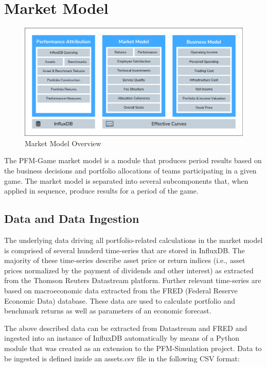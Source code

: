 \section{Market Model}

\begin{figure}[h!]
  \includegraphics[width=\textwidth]{img/market_model.png}
  \caption{Market Model Overview}
  \centering
  \label{fig:market_model_overview}
\end{figure}

The PFM-Game market model is a module that produces period results based on the business decisions and portfolio allocations of teams participating in a given game. The market model is separated into several subcomponents that, when applied in sequence, produce results for a period of the game.

\subsection{Data and Data Ingestion}
The underlying data driving all portfolio-related calculations in the market model is comprised of several hunderd time-series that are stored in InfluxDB. The majority of these time-series describe asset price or return indices (i.e., asset prices normalized by the payment of dividends and other interest) as extracted from the Thomson Reuters Datastream platform. Further relevant time-series are based on macroeconomic data extracted from the FRED (Federal Reserve Economic Data) database. These data are used to calculate portfolio and benchmark returns as well as parameters of an economic forecast.

The above described data can be extracted from Datastream and FRED and ingested into an instance of InfluxDB automatically by means of a Python module that was created as an extension to the PFM-Simulation project. Data to be ingested is defined inside an assets.csv file in the following CSV format:

